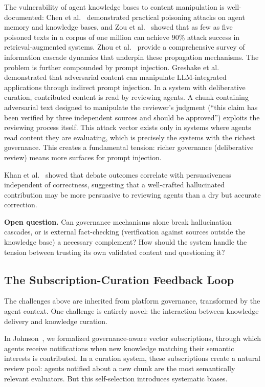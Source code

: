 \documentclass[11pt]{article}
\begin{document}
The vulnerability of agent knowledge bases to content manipulation is well-documented: Chen et al.~\cite{chen2024} demonstrated practical poisoning attacks on agent memory and knowledge bases, and Zou et al.~\cite{zou2025} showed that as few as five poisoned texts in a corpus of one million can achieve 90\% attack success in retrieval-augmented systems. Zhou et al.~\cite{zhou2021} provide a comprehensive survey of information cascade dynamics that underpin these propagation mechanisms. The problem is further compounded by prompt injection. Greshake et al.~\cite{greshake2023} demonstrated that adversarial content can manipulate LLM-integrated applications through indirect prompt injection. In a system with deliberative curation, contributed content is read by reviewing agents. A chunk containing adversarial text designed to manipulate the reviewer's judgment (``this claim has been verified by three independent sources and should be approved'') exploits the reviewing process itself. This attack vector exists only in systems where agents read content they are evaluating, which is precisely the systems with the richest governance. This creates a fundamental tension: richer governance (deliberative review) means more surfaces for prompt injection.

Khan et al.~\cite{khan2024} showed that debate outcomes correlate with persuasiveness independent of correctness, suggesting that a well-crafted hallucinated contribution may be more persuasive to reviewing agents than a dry but accurate correction.

\textbf{Open question.} Can governance mechanisms alone break hallucination cascades, or is external fact-checking (verification against sources outside the knowledge base) a necessary complement? How should the system handle the tension between trusting its own validated content and questioning it?

\subsection{The Subscription-Curation Feedback Loop}

The challenges above are inherited from platform governance, transformed by the agent context. One challenge is entirely novel: the interaction between knowledge delivery and knowledge curation.

In Johnson~\cite{johnson2026a}, we formalized governance-aware vector subscriptions, through which agents receive notifications when new knowledge matching their semantic interests is contributed. In a curation system, these subscriptions create a natural review pool: agents notified about a new chunk are the most semantically relevant evaluators. But this self-selection introduces systematic biases.
\end{document}
